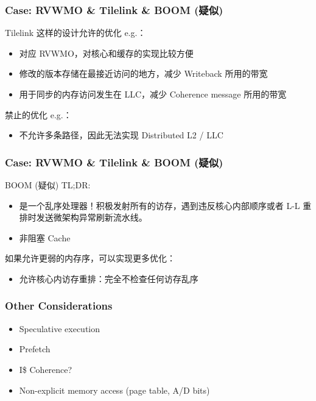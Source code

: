 \documentclass[UTF-8]{ctexbeamer}
\begin{document}
\begin{frame}
  \frametitle{Case: RVWMO \& Tilelink \& BOOM (疑似)}

  Tilelink 这样的设计允许的优化 e.g.：
  \begin{itemize}
    \item 对应 RVWMO，对核心和缓存的实现比较方便
    \item 修改的版本存储在最接近访问的地方，减少 Writeback 所用的带宽
    \item 用于同步的内存访问发生在 LLC，减少 Coherence message 所用的带宽
  \end{itemize}

  \pause

  禁止的优化 e.g.：
  \begin{itemize}
    \item 不允许多条路径，因此无法实现 Distributed L2 / LLC
  \end{itemize}
\end{frame}

\begin{frame}
  \frametitle{Case: RVWMO \& Tilelink \& BOOM (疑似)}

  BOOM (疑似) TL;DR:
  \begin{itemize}
    \item 是一个乱序处理器！积极发射所有的访存，遇到违反核心内部顺序或者 L-L 重排时发送微架构异常刷新流水线。
    \item 非阻塞 Cache
  \end{itemize}

  \vspace{1em}
  \pause
  如果允许更弱的内存序，可以实现更多优化：
  \begin{itemize}
    \item 允许核心内访存重排：完全不检查任何访存乱序
  \end{itemize}
\end{frame}

\begin{frame}
  \frametitle{Other Considerations}

  \begin{itemize}
    \item Speculative execution
    \item Prefetch
    \item I\$ Coherence?
    \item Non-explicit memory access (page table, A/D bits)
  \end{itemize}
\end{frame}
\end{document}
